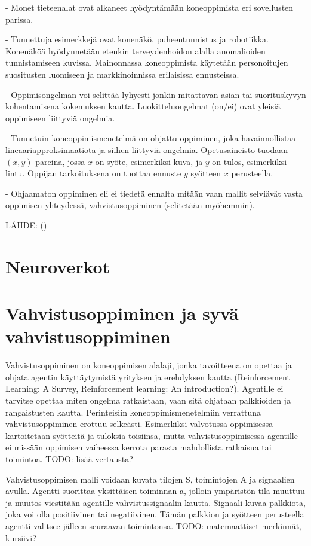 \documentclass[utf8]{gradu3}
\begin{document}
- Monet tieteenalat ovat alkaneet hyödyntämään koneoppimista eri sovellusten parissa.

- Tunnettuja esimerkkejä ovat konenäkö, puheentunnistus ja robotiikka. Konenäköä hyödynnetään etenkin terveydenhoidon alalla anomalioiden tunnistamiseen kuvissa. Mainonnassa koneoppimista käytetään personoitujen suositusten luomiseen ja markkinoinnissa erilaisissa ennusteissa.

- Oppimisongelman voi selittää lyhyesti jonkin mitattavan asian tai suorituskyvyn kohentamisena kokemuksen kautta. Luokitteluongelmat (on/ei) ovat yleisiä oppimiseen liittyviä ongelmia.

- Tunnetuin koneoppimismenetelmä on ohjattu oppiminen, joka havainnollistaa lineaariapproksimaatiota ja siihen liittyviä ongelmia. Opetusaineisto tuodaan \((x,y)\) pareina, jossa \(x\) on syöte, esimerkiksi kuva, ja \(y\) on tulos, esimerkiksi lintu. Oppijan tarkoituksena on tuottaa ennuste \(y\) syötteen \(x\) perusteella.

- Ohjaamaton oppiminen eli ei tiedetä ennalta mitään vaan mallit selviävät vasta oppimisen yhteydessä, vahvistusoppiminen (selitetään myöhemmin).

LÄHDE: (\parencite{jordan2015machine})

\section{Neuroverkot}

\section{Vahvistusoppiminen ja syvä vahvistusoppiminen}

Vahvistusoppiminen on koneoppimisen alalaji, jonka tavoitteena on opettaa ja ohjata agentin käyttäytymistä yrityksen ja erehdyksen kautta (Reinforcement Learning: A Survey, Reinforcement learning: An introduction?). Agentille ei tarvitse opettaa miten ongelma ratkaistaan, vaan sitä ohjataan palkkioiden ja rangaistusten kautta. Perinteisiin koneoppimismenetelmiin verrattuna vahvistusoppiminen erottuu selkeästi. Esimerkiksi valvotussa oppimisessa kartoitetaan syötteitä ja tuloksia toisiinsa, mutta vahvistusoppimisessa agentille ei missään oppimisen vaiheessa kerrota parasta mahdollista ratkaisua tai toimintoa. TODO: lisää vertausta?

Vahvistusoppimisen malli voidaan kuvata tilojen S, toimintojen A ja signaalien avulla. Agentti suorittaa yksittäisen toiminnan a, jolloin ympäristön tila muuttuu ja muutos viestitään agentille vahvistussignaalin kautta. Signaali kuvaa palkkiota, joka voi olla positiivinen tai negatiivinen. Tämän palkkion ja syötteen perusteella agentti valitsee jälleen seuraavan toimintonsa. TODO: matemaattiset merkinnät, kursiivi?
\end{document}
